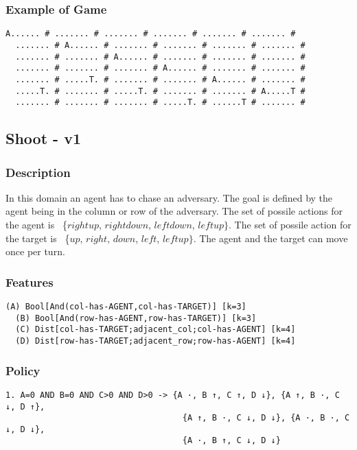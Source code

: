 \documentclass[a4paper]{article}
\begin{document}
\subsubsection{Example of Game}
\begin{Verbatim}[fontsize=\footnotesize]
  A...... # ....... # ....... # ....... # ....... # ....... #
  ....... # A...... # ....... # ....... # ....... # ....... #
  ....... # ....... # A...... # ....... # ....... # ....... #
  ....... # ....... # ....... # A...... # ....... # ....... #
  ....... # .....T. # ....... # ....... # A...... # ....... #
  .....T. # ....... # .....T. # ....... # ....... # A.....T #
  ....... # ....... # ....... # .....T. # ......T # ....... #
\end{Verbatim}

\subsection{Shoot - v1}
\subsubsection{Description}
In this domain an agent has to chase an adversary. The goal is defined by the agent being in the column or row of the adversary. The set of possile actions for the agent is ~\{$rightup$, $rightdown$, $leftdown$, $leftup\}$.
The set of possile action for the target is ~\{$up$, $right$, $down$, $left$, $leftup\}$.  The agent and the target can move once per turn.

\subsubsection{Features}
\begin{Verbatim}[fontsize=\footnotesize]
  (A) Bool[And(col-has-AGENT,col-has-TARGET)] [k=3]
  (B) Bool[And(row-has-AGENT,row-has-TARGET)] [k=3]
  (C) Dist[col-has-TARGET;adjacent_col;col-has-AGENT] [k=4]
  (D) Dist[row-has-TARGET;adjacent_row;row-has-AGENT] [k=4]

\end{Verbatim}

\subsubsection{Policy}
\begin{Verbatim}[fontsize=\footnotesize]
  1. A=0 AND B=0 AND C>0 AND D>0 -> {A ·, B ↑, C ↑, D ↓}, {A ↑, B ·, C ↓, D ↑},
                                    {A ↑, B ·, C ↓, D ↓}, {A ·, B ·, C ↓, D ↓},
                                    {A ·, B ↑, C ↓, D ↓}

\end{Verbatim}
\end{document}
